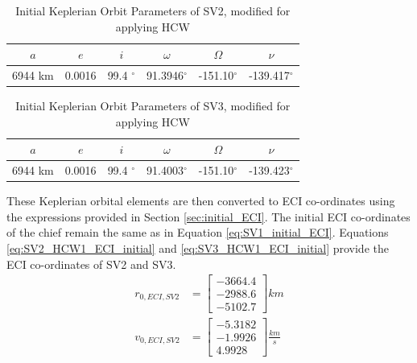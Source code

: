 \begin{table}[h]
\centering
\begin{tabular}{cccccc} \hline
    $a$ & $e$ & $i$ & $\omega$ & $\Omega$ & $\nu$ \\ \hline 
     6944 km & 0.0016 & 99.4 $^\circ$ & 91.3946$^\circ$ & -151.10$^\circ$ & -139.417$^\circ$ \\ \hline
\end{tabular}
\caption{Initial Keplerian Orbit Parameters of SV2, modified for applying HCW}
\label{tab:abs_oe_kepler_SV2_HCW}
\end{table}

\begin{table}[h]
\centering
\begin{tabular}{cccccc} \hline
    $a$ & $e$ & $i$ & $\omega$ & $\Omega$ & $\nu$ \\ \hline 
     6944 km & 0.0016 & 99.4 $^\circ$ & 91.4003$^\circ$ & -151.10$^\circ$ & -139.423$^\circ$ \\ \hline
\end{tabular}
\caption{Initial Keplerian Orbit Parameters of SV3, modified for applying HCW}
\label{tab:abs_oe_kepler_SV3_HCW}
\end{table}

These Keplerian orbital elements are then converted to ECI co-ordinates using the expressions provided in Section \ref{sec:initial_ECI}. The initial ECI co-ordinates of the chief remain the same as in Equation \ref{eq:SV1_initial_ECI}. Equations \ref{eq:SV2_HCW1_ECI_initial} and \ref{eq:SV3_HCW1_ECI_initial} provide the ECI co-ordinates of SV2 and SV3. 
\begin{align} \label{eq:SV2_HCW1_ECI_initial}
    r_{0, ECI, SV2} &= \begin{bmatrix}
        -3664.4 \\
        -2988.6 \\
        -5102.7
    \end{bmatrix} km \\
    v_{0, ECI, SV2} &= \begin{bmatrix}
        -5.3182 \\
        -1.9926 \\
        4.9928
    \end{bmatrix} \frac{km}{s}
\end{align}

